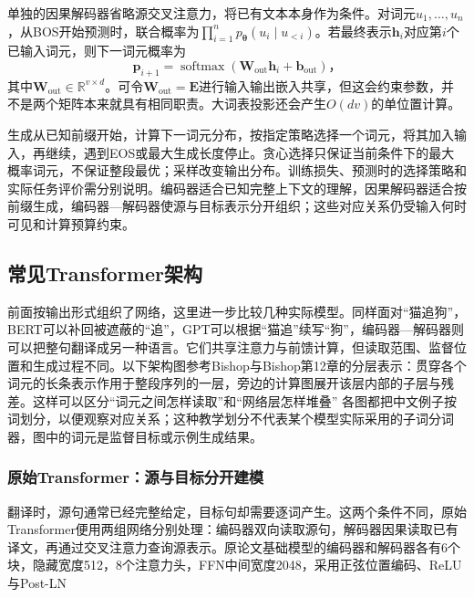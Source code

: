 单独的因果解码器省略源交叉注意力，将已有文本本身作为条件。对词元$u_1,\ldots,u_n$，从BOS开始预测时，联合概率为$\prod_{i=1}^n p_{\bm\theta}(u_i\mid u_{<i})$。若最终表示$\bm h_i$对应第$i$个已输入词元，则下一词元概率为
\begin{equation}
  \bm p_{i+1}=\operatorname{softmax}
     (\bm W_{\mathrm{out}}\bm h_i+\bm b_{\mathrm{out}})\text{，}
  \label{eq:transformer-vocabulary-head}
\end{equation}
其中$\bm W_{\mathrm{out}}\in\mathbb R^{v\times d}$。可令$\bm W_{\mathrm{out}}=\bm E$进行输入输出嵌入共享，但这会约束参数，并不是两个矩阵本来就具有相同职责。大词表投影还会产生$O(dv)$的单位置计算。

生成从已知前缀开始，计算下一词元分布，按指定策略选择一个词元，将其加入输入，再继续，遇到EOS或最大生成长度停止。贪心选择只保证当前条件下的最大概率词元，不保证整段最优；采样改变输出分布。训练损失、预测时的选择策略和实际任务评价需分别说明。编码器适合已知完整上下文的理解，因果解码器适合按前缀生成，编码器—解码器使源与目标表示分开组织；这些对应关系仍受输入何时可见和计算预算约束。

\subsection{常见Transformer架构}
\label{sec:transformer-common-architectures}

前面按输出形式组织了网络，这里进一步比较几种实际模型。同样面对“猫追狗”，BERT可以补回被遮蔽的“追”，GPT可以根据“猫追”续写“狗”，编码器—解码器则可以把整句翻译成另一种语言。它们共享注意力与前馈计算，但读取范围、监督位置和生成过程不同。以下架构图参考Bishop与Bishop第12章的分层表示：贯穿各个词元的长条表示作用于整段序列的一层，旁边的计算图展开该层内部的子层与残差。这样可以区分“词元之间怎样读取”和“网络层怎样堆叠” 各图都把中文例子按词划分，以便观察对应关系；这种教学划分不代表某个模型实际采用的子词分词器，图中的词元是监督目标或示例生成结果。

\subsubsection{原始Transformer：源与目标分开建模}

翻译时，源句通常已经完整给定，目标句却需要逐词产生。这两个条件不同，原始Transformer便用两组网络分别处理：编码器双向读取源句，解码器因果读取已有译文，再通过交叉注意力查询源表示。原论文基础模型的编码器和解码器各有6个块，隐藏宽度512，8个注意力头，FFN中间宽度2048，采用正弦位置编码、ReLU与Post-LN

